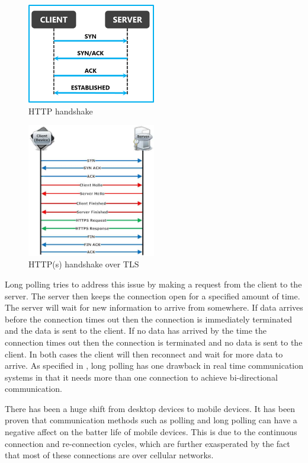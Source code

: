 \begin{figure}[ht]
  \centering
    \includegraphics[width=0.5\textwidth]{figures/http-handshake.png}
    \caption{HTTP handshake}
    \label{fig:http-handshake}
\end{figure}

\begin{figure}[ht]
  \centering
    \includegraphics[width=0.5\textwidth]{figures/https-handshake.jpg}
    \caption{HTTP(s) handshake over TLS}
    \label{fig:https-handshake}
\end{figure}

Long polling tries to address this issue by making a request from the client to the server. The server then keeps the connection open for a specified amount of time. The server will wait for new information to arrive from somewhere. If data arrives before the connection times out then the connection is immediately terminated and the data is sent to the client. If no data has arrived by the time the connection times out then the connection is terminated and no data is sent to the client. In both cases the client will then reconnect and wait for more data to arrive. As specified in \cite{6364271}, long polling has one drawback in real time communication systems in that it needs more than one connection to achieve bi-directional communication.

There has been a huge shift from desktop devices to mobile devices\cite{6365155}. It has been proven that communication methods such as polling and long polling can have a negative affect on the batter life of mobile devices\cite{6364271}. This is due to the continuous connection and re-connection cycles, which are further exasperated by the fact that most of these connections are over cellular networks.

